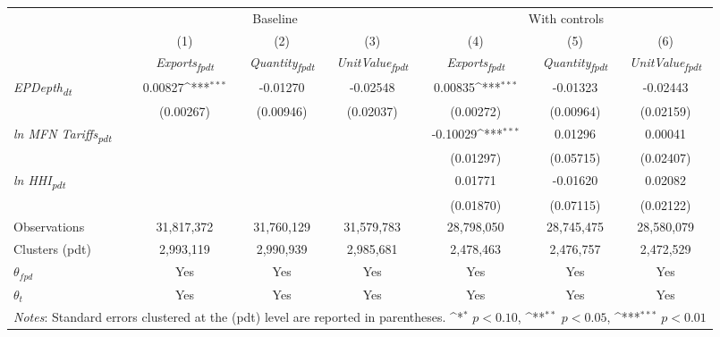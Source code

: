 {
\def\sym#1{\ifmmode^{#1}\else\(^{#1}\)\fi}
\begin{tabular}{l*{6}{c}}
\toprule
&\multicolumn{3}{c}{Baseline}&\multicolumn{3}{c}{With controls}\\\cmidrule(lr){2-4}\cmidrule(lr){5-7}
&(1)&(2)&(3)&(4)&(5)&(6)\\
&\textit{Exports\textsubscript{fpdt}}&\textit{Quantity\textsubscript{fpdt}}&\textit{UnitValue\textsubscript{fpdt}}&\textit{Exports\textsubscript{fpdt}}&\textit{Quantity\textsubscript{fpdt}}&\textit{UnitValue\textsubscript{fpdt}}\\
\midrule
\textit{EPDepth\textsubscript{dt}} & 0.00827\sym{***} & -0.01270 & -0.02548 & 0.00835\sym{***} & -0.01323 & -0.02443\\
  & (0.00267) & (0.00946) & (0.02037) & (0.00272) & (0.00964) & (0.02159)\\
\addlinespace
\textit{ln MFN Tariffs\textsubscript{pdt}} &  &  &  & -0.10029\sym{***} & 0.01296 & 0.00041\\
  &  &  &  & (0.01297) & (0.05715) & (0.02407)\\
\addlinespace
\textit{ln HHI\textsubscript{pdt}} &  &  &  & 0.01771 & -0.01620 & 0.02082\\
  &  &  &  & (0.01870) & (0.07115) & (0.02122)\\
\midrule
Observations & 31,817,372 & 31,760,129 & 31,579,783 & 28,798,050 & 28,745,475 & 28,580,079\\
Clusters (pdt) & 2,993,119 & 2,990,939 & 2,985,681 & 2,478,463 & 2,476,757 & 2,472,529\\
$\theta_{fpd}$ & Yes & Yes & Yes & Yes & Yes & Yes\\
$\theta_{t}$ & Yes & Yes & Yes & Yes & Yes & Yes\\
\bottomrule
\multicolumn{7}{l}{\footnotesize \textit{Notes}: Standard errors clustered at the (pdt) level are reported in parentheses. \sym{*} \(p<0.10\), \sym{**} \(p<0.05\), \sym{***} \(p<0.01\)}\\
\end{tabular}
}
